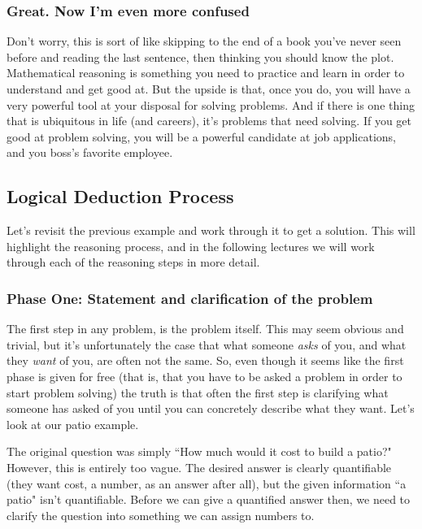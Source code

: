\subsubsection*{Great. Now I'm even more confused}
Don't worry, this is sort of like skipping to the end of a book you've never seen before and reading the last sentence, then thinking you should know the plot. Mathematical reasoning is something you need to practice and learn in order to understand and get good at. But the upside is that, once you do, you will have a very powerful tool at your disposal for solving problems. And if there is one thing that is ubiquitous in life (and careers), it's problems that need solving. If you get good at problem solving, you will be a powerful candidate at job applications, and you boss's favorite employee.



\subsection{Logical Deduction Process}

Let's revisit the previous example and work through it to get a solution. This will highlight the reasoning process, and in the following lectures we will work through each of the reasoning steps in more detail.

\subsubsection*{Phase One: Statement and clarification of the problem}

The first step in any problem, is the problem itself. This may seem obvious and trivial, but it's unfortunately the case that what someone \textit{asks} of you, and what they \textit{want} of you, are often not the same. So, even though it seems like the first phase is given for free (that is, that you have to be asked a problem in order to start problem solving) the truth is that often the first step is clarifying what someone has asked of you until you can concretely describe what they want. Let's look at our patio example.

The original question was simply ``How much would it cost to build a patio?" However, this is entirely too vague. The desired answer is clearly quantifiable (they want cost, a number, as an answer after all), but the given information ``a patio" isn't quantifiable. Before we can give a quantified answer then, we need to clarify the question into something we can assign numbers to.

